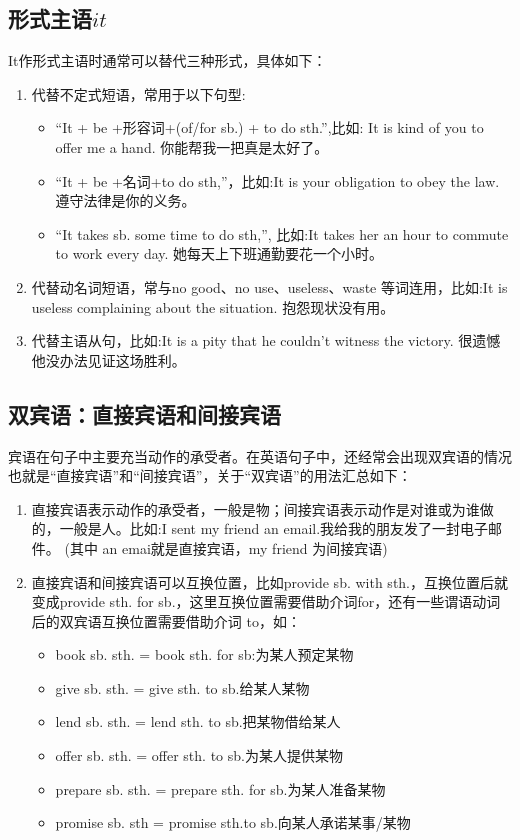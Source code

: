 \subsection{形式主语\(it\)}

It作形式主语时通常可以替代三种形式，具体如下：
\begin{enumerate}
  \item 代替不定式短语，常用于以下句型:
        \begin{itemize}
          \item “It + be +形容词+(of/for sb.) + to do sth.”,比如: It is kind of you to offer me a hand. 你能帮我一把真是太好了。
          \item “It + be +名词+to do sth,”，比如:It is your obligation to obey the law. 遵守法律是你的义务。
          \item “It takes sb. some time to do sth,”, 比如:It takes her an hour to commute to work every day. 她每天上下班通勤要花一个小时。
        \end{itemize}
  \item 代替动名词短语，常与no good、no use、useless、waste 等词连用，比如:It is useless complaining about the situation. 抱怨现状没有用。
  \item 代替主语从句，比如:It is a pity that he couldn't witness the victory. 很遗憾他没办法见证这场胜利。
\end{enumerate}

\subsection{双宾语：直接宾语和间接宾语}

宾语在句子中主要充当动作的承受者。在英语句子中，还经常会出现双宾语的情况也就是“直接宾语”和“间接宾语”，关于“双宾语”的用法汇总如下：
\begin{enumerate}
  \item 直接宾语表示动作的承受者，一般是物；间接宾语表示动作是对谁或为谁做的，一般是人。比如:I sent my friend an email.我给我的朋友发了一封电子邮件。 (其中 an emai就是直接宾语，my friend 为间接宾语)
  \item 直接宾语和间接宾语可以互换位置，比如provide sb. with sth.，互换位置后就变成provide sth. for sb.，这里互换位置需要借助介词for，还有一些谓语动词后的双宾语互换位置需要借助介词 to，如：
        \begin{itemize}
          \item book sb. sth. = book sth. for sb:为某人预定某物
          \item give sb. sth. = give sth. to sb.给某人某物
          \item lend sb. sth. = lend sth. to sb.把某物借给某人
          \item offer sb. sth. = offer sth. to sb.为某人提供某物
          \item prepare sb. sth. = prepare sth. for sb.为某人准备某物
          \item promise sb. sth = promise sth.to sb.向某人承诺某事/某物
        \end{itemize}
\end{enumerate}

